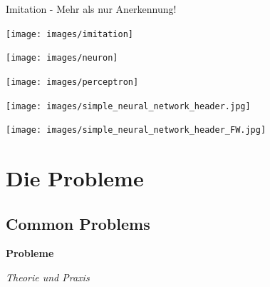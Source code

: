 \documentclass[aspectratio=169,x11names]{beamer}
\begin{document}
\begin{frame}
\begin{center}
\Large Imitation - Mehr als nur Anerkennung!
\medskip\medskip

\texttt{[image: images/imitation]}
\end{center}
\end{frame}

\begin{frame}
\begin{center}
\texttt{[image: images/neuron]} 
\end{center}
\end{frame}

\begin{frame}
\begin{center}
\texttt{[image: images/perceptron]} 
\end{center}
\end{frame}

\begin{frame}
\begin{center}
\texttt{[image: images/simple\_neural\_network\_header.jpg]} 
\end{center}
\end{frame}

\begin{frame}
\begin{center}
\texttt{[image: images/simple\_neural\_network\_header\_FW.jpg]} 
\end{center}
\end{frame}


\section{Die Probleme}


\subsection{Common Problems}

\begin{frame}
\begin{center}
\Huge
\textbf{Probleme} \bigskip

\huge \textit{Theorie und Praxis}
\end{center}
\end{frame}
\end{document}
